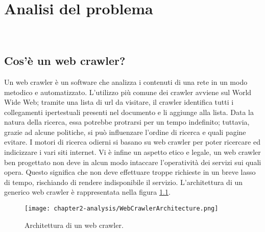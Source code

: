 
\chapter{Analisi del problema}
\label{cap:analisi-del-problema}

\\

\section{Cos’è un web crawler?}

Un web crawler è un software che analizza i contenuti di una rete in un modo metodico e automatizzato. L’utilizzo più comune dei crawler avviene sul World Wide Web; tramite una lista di url da visitare, il crawler identifica tutti i collegamenti ipertestuali presenti nel documento e li aggiunge alla lista. Data la natura della ricerca, essa potrebbe protrarsi per un tempo indefinito; tuttavia, grazie ad alcune politiche, si può influenzare l’ordine di ricerca e quali pagine evitare. I motori di ricerca odierni si basano su web crawler per poter ricercare ed indicizzare i vari siti internet. Vi è infine un aspetto etico e legale, un web crawler ben progettato non deve in alcun modo intaccare l'operatività dei servizi sui quali opera. Questo significa che non deve effettuare troppe richieste in un breve lasso di tempo, rischiando di rendere indisponibile il servizio. L'architettura di un generico web crawler è rappresentata nella figura \ref{fig:architettura web crawler}.

\begin{figure}[!h] 
    \centering 
    \texttt{[image: chapter2-analysis/WebCrawlerArchitecture.png]} 
    \caption{Architettura di un web crawler.}
    \label{fig:architettura web crawler}
\end{figure}

